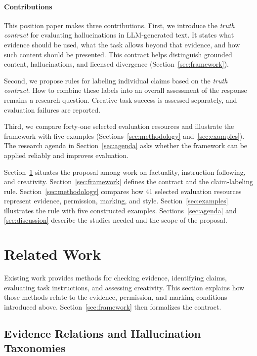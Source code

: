 \documentclass{clv2025}
\begin{document}
\paragraph{Contributions}
This position paper makes three contributions. First, we introduce the
\emph{truth contract} for evaluating hallucinations in LLM-generated text. It states what evidence should be used, what the task
allows beyond that evidence, and how such content should be presented. This
contract helps distinguish grounded content, hallucinations, and licensed
divergence (Section~\ref{sec:framework}).

Second, we propose rules for labeling individual claims based on the \emph{truth contract}.
How to combine these labels into an overall assessment of the response remains a research question. 
Creative-task success is assessed separately, and evaluation failures are reported.

Third, we compare forty-one selected evaluation resources and illustrate the
framework with five examples
(Sections~\ref{sec:methodology} and~\ref{sec:examples}). %
The research agenda in Section~\ref{sec:agenda} asks whether the framework can be applied reliably and improves evaluation.

Section~\ref{sec:related} situates the proposal among work on factuality,
instruction following, and creativity. Section~\ref{sec:framework} defines
the contract and the claim-labeling rule. Section~\ref{sec:methodology}
compares how 41 selected evaluation resources represent evidence,
permission, marking, and style. Section~\ref{sec:examples} illustrates the rule
with five constructed examples. Sections~\ref{sec:agenda} and
\ref{sec:discussion} describe the studies needed and the scope of the proposal.

\section{Related Work}\label{sec:related}

Existing work provides methods for checking evidence, identifying claims,
evaluating task instructions, and assessing creativity. This section explains
how those methods relate to the evidence, permission, and marking conditions
introduced above. Section~\ref{sec:framework} then formalizes the contract.

\subsection{Evidence Relations and Hallucination Taxonomies}
\end{document}
